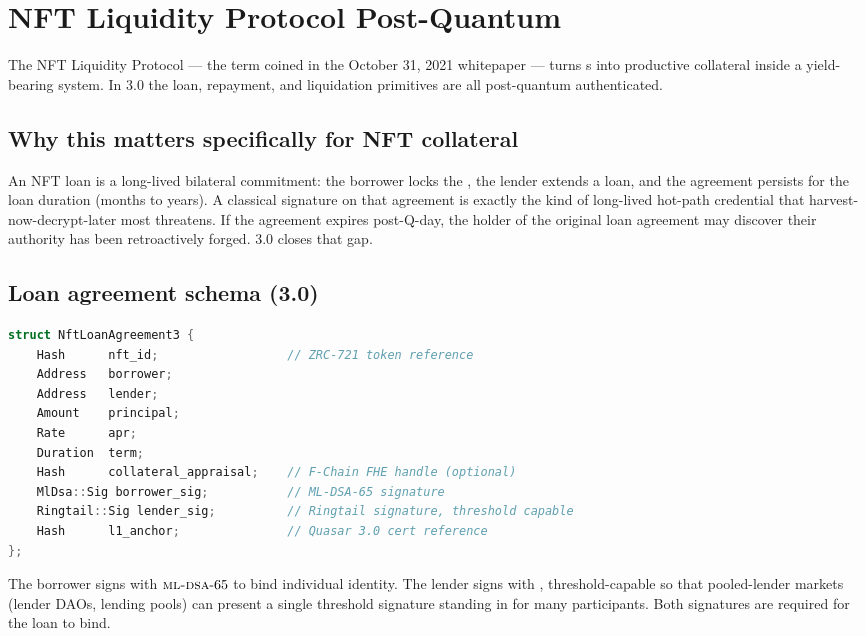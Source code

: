 \section{NFT Liquidity Protocol Post-Quantum}
\label{sec:nft-liquidity-pq}

The NFT Liquidity Protocol --- the term \Zoo{} coined in the
October 31, 2021 whitepaper \cite{zoo-2021} --- turns \NFT{}s into
productive collateral inside a yield-bearing system. In 3.0 the
loan, repayment, and liquidation primitives are all post-quantum
authenticated.

\subsection{Why this matters specifically for NFT collateral}

An NFT loan is a long-lived bilateral commitment: the borrower locks
the \NFT{}, the lender extends a loan, and the agreement persists
for the loan duration (months to years). A classical signature on
that agreement is exactly the kind of long-lived hot-path credential
that harvest-now-decrypt-later most threatens. If the agreement
expires post-Q-day, the holder of the original loan agreement may
discover their authority has been retroactively forged. 3.0 closes
that gap.

\subsection{Loan agreement schema (3.0)}

\begin{lstlisting}[language=C++,caption={3.0 NFT loan agreement schema}]
struct NftLoanAgreement3 {
    Hash      nft_id;                  // ZRC-721 token reference
    Address   borrower;
    Address   lender;
    Amount    principal;
    Rate      apr;
    Duration  term;
    Hash      collateral_appraisal;    // F-Chain FHE handle (optional)
    MlDsa::Sig borrower_sig;           // ML-DSA-65 signature
    Ringtail::Sig lender_sig;          // Ringtail signature, threshold capable
    Hash      l1_anchor;               // Quasar 3.0 cert reference
};
\end{lstlisting}

The borrower signs with $\textsc{ml-dsa}{}\text{-}65$ to bind individual
identity. The lender signs with \Ringtail{}, threshold-capable so
that pooled-lender markets (lender DAOs, lending pools) can present
a single threshold signature standing in for many participants. Both
signatures are required for the loan to bind.

